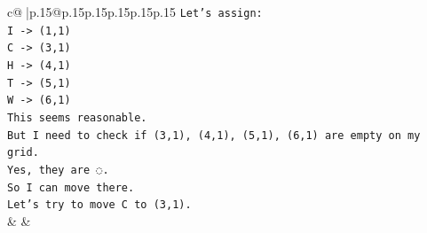 \documentclass{article}
\begin{document}
{\begin{supertabular}{c@{$\;$}|p{.15\linewidth}@{}p{.15\linewidth}p{.15\linewidth}p{.15\linewidth}p{.15\linewidth}p{.15\linewidth}}
{{{\texttt{Let's assign:} \\
\texttt{I {-}> (1,1)} \\
\texttt{C {-}> (3,1)} \\
\texttt{H {-}> (4,1)} \\
\texttt{T {-}> (5,1)} \\
\texttt{W {-}> (6,1)} \\
\texttt{This seems reasonable.} \\
\texttt{But I need to check if (3,1), (4,1), (5,1), (6,1) are empty on my grid.} \\
\texttt{Yes, they are ◌.} \\
\texttt{So I can move there.} \\
\texttt{Let's try to move C to (3,1).} \\
            }
        }
    }
    & & \\ \\


\end{supertabular}}
\end{document}
